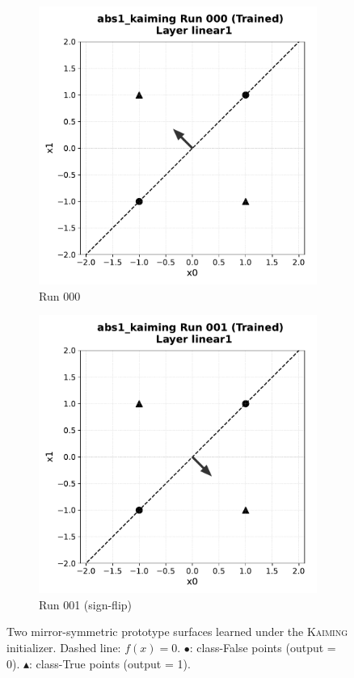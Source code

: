\begin{figure}[h]
  \centering
  \begin{subfigure}{0.46\textwidth}
    \includegraphics[width=\linewidth]{abs1/figs/kaiming_run000.pdf}
    \caption{Run 000}
  \end{subfigure}\hfill
  \begin{subfigure}{0.46\textwidth}
    \includegraphics[width=\linewidth]{abs1/figs/kaiming_run001.pdf}
    \caption{Run 001 (sign-flip)}
  \end{subfigure}
  \caption{Two mirror-symmetric prototype surfaces learned under the
           \textsc{Kaiming} initializer.  
           Dashed line: \(f(x)=0\).  
           \(\bullet\): class-False points (output = 0).  
           \(\blacktriangle\): class-True points (output = 1).}
  \label{fig:abs1-hyperplanes}
\end{figure}

